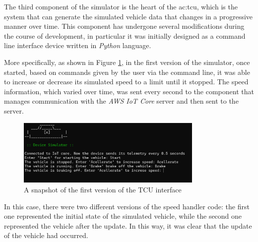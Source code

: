 The third component of the simulator is the heart of the \gls{ac:tcu}, which is the system that can generate the simulated vehicle data that changes in a progressive manner over time. This component has undergone several modifications during the course of development, in particular it was initially designed as a command line interface device written in \textit{Python} language.

More specifically, as shown in Figure \ref{fig:telemetryV1}, in the first version of the simulator, once started, based on commands given by the user via the command line, it was able to increase or decrease its simulated speed to a limit until it stopped. The speed information, which varied over time, was sent every second to the component that manages communication with the \textit{AWS IoT Core} server and then sent to the server.

\begin{figure}[h]  %
    \centering
    \includegraphics[width=0.8\textwidth]{images/telemetryV1.png}  %
    \caption{A snapshot of the first version of the TCU interface}
    \label{fig:telemetryV1}
\end{figure} 

In this case, there were two different versions of the speed handler code: the first one represented the initial state of the simulated vehicle, while the second one represented the vehicle after the update. In this way, it was clear that the update of the vehicle had occurred.

